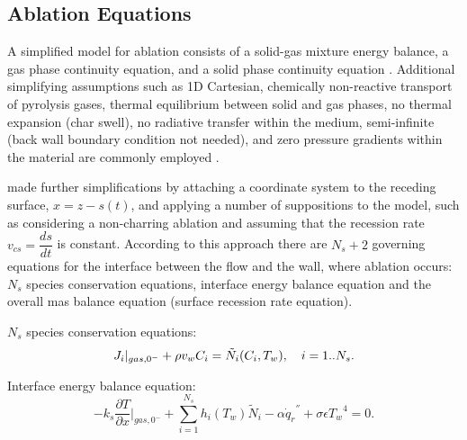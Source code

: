 \documentclass[10pt]{article}
\begin{document}
\subsection{Ablation Equations}



A simplified model for ablation consists of a solid-gas mixture energy balance, a gas phase continuity equation, and a solid phase continuity equation \citep{Amar2006}. Additional simplifying assumptions such as 1D Cartesian,
chemically non-reactive transport of pyrolysis gases, thermal equilibrium between solid and gas phases, no thermal expansion (char swell), no radiative transfer within the medium, semi-infinite (back wall boundary condition not needed), and zero pressure gradients within the material are commonly employed \citep{Rochan2010,Rochan2010b}. 



\citet{Rochan2010} made further simplifications by attaching a  coordinate system to the receding surface, $x = z-s(t)$, and  applying a number of suppositions to the model, such as considering a  non-charring ablation and assuming that the recession rate $v_{cs}=\dfrac{ds}{dt}$ is constant. According to this approach there are $N_s+2$ governing equations for the interface between the flow and the wall, where ablation occurs: $N_s$ species conservation equations, interface energy balance equation and the overall mas balance equation (surface recession rate equation).

$N_s$ species conservation equations:
\begin{equation}\label{eq:non_charring_species_conservation} 
J_i \vert_{gas,0^-} + \rho v_w C_i = \tilde{N}_i (C_i, T_w),  \quad i=1..N_s. \\
\end{equation}

Interface energy balance equation:
\begin{equation}\label{eq:non_charring_energy_equation_final_form}
- k_s \frac{\partial T}{\partial x} \vert_{gas,0^-} + \sum_{i=1}^{N_s} h_i(T_w) \tilde{N}_i
- \alpha {\dot{q}_r}^{''} + \sigma \epsilon {T_w}^{4} = 0. 
\end{equation}
\end{document}
